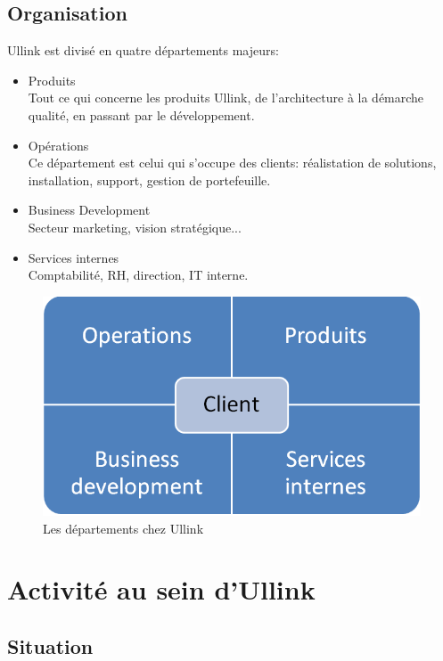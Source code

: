 \documentclass[a4paper, 12pt]{article}
\begin{document}
\subsection{Organisation}

Ullink est divisé en quatre départements majeurs:

\begin{itemize}
\item Produits\\
Tout ce qui concerne les produits Ullink, de l'architecture à la démarche qualité, en passant par le développement.

\item Opérations\\
Ce département est celui qui s'occupe des clients: réalistation de solutions, installation, support, gestion de portefeuille.

\item Business Development\\
Secteur marketing, vision stratégique...

\item Services internes\\
Comptabilité, RH, direction, IT interne.
\end{itemize}

\begin{figure}[!h]
\includegraphics[width=\textwidth]{orga_deps_client.png}
\caption{Les départements chez Ullink}
\label{depts_ullink}
\end{figure}

\section{Activité au sein d'Ullink}

\subsection{Situation}
\end{document}
